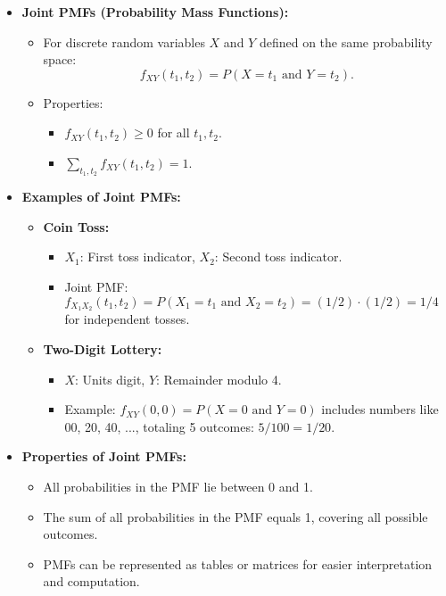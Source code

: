 \documentclass{article}
\begin{document}
\begin{itemize}
  \item \textbf{Joint PMFs (Probability Mass Functions):}
    \begin{itemize}
      \item For discrete random variables $X$ and $Y$ defined on the same probability space:
        \[
          f_{XY}(t_1, t_2) = P(X = t_1 \text{ and } Y = t_2).
        \]
      \item Properties:
        \begin{itemize}
          \item $f_{XY}(t_1, t_2) \geq 0$ for all $t_1, t_2$.
          \item $\sum_{t_1, t_2} f_{XY}(t_1, t_2) = 1$.
        \end{itemize}
    \end{itemize}

  \item \textbf{Examples of Joint PMFs:}
    \begin{itemize}
      \item \textbf{Coin Toss:}
        \begin{itemize}
          \item $X_1$: First toss indicator, $X_2$: Second toss indicator.
          \item Joint PMF: $f_{X_1X_2}(t_1, t_2) = P(X_1 = t_1 \text{ and } X_2 = t_2) = (1/2) \cdot (1/2) = 1/4$ for independent tosses.
        \end{itemize}
      \item \textbf{Two-Digit Lottery:}
        \begin{itemize}
          \item $X$: Units digit, $Y$: Remainder modulo 4.
          \item Example: $f_{XY}(0, 0) = P(X = 0 \text{ and } Y = 0)$ includes numbers like 00, 20, 40, ..., totaling 5 outcomes: $5/100 = 1/20$.
        \end{itemize}
    \end{itemize}

  \item \textbf{Properties of Joint PMFs:}
    \begin{itemize}
      \item All probabilities in the PMF lie between 0 and 1.
      \item The sum of all probabilities in the PMF equals 1, covering all possible outcomes.
      \item PMFs can be represented as tables or matrices for easier interpretation and computation.
    \end{itemize}
\end{itemize}
\end{document}
